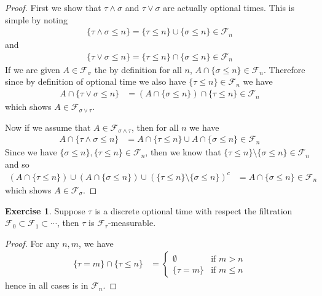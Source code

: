 \documentclass{amsart}
\theoremstyle{remark}
\theoremstyle{definition}
\newtheorem{ex}[thm]{Exercise}
\begin{document}
\begin{proof}
First we show that $\tau \wedge \sigma$ and $\tau \vee \sigma$ are
actually optional times.  This is simple by noting
\begin{align*}
\lbrace \tau \wedge \sigma \leq n \rbrace = \lbrace \tau \leq n
\rbrace \cup \lbrace \sigma \leq n \rbrace \in \mathcal{F}_n
\end{align*}
and
\begin{align*}
\lbrace \tau \vee \sigma \leq n \rbrace = \lbrace \tau \leq n
\rbrace \cap \lbrace \sigma \leq n \rbrace \in \mathcal{F}_n
\end{align*}
If we are given $A \in \mathcal{F}_\sigma$ the by definition for all
$n$, $A \cap \lbrace \sigma \leq n \rbrace \in \mathcal{F}_n$.
Therefore since by definition of optional time we also have $\lbrace
\tau \leq n \rbrace \in \mathcal{F}_n$ we have
\begin{align*}
A \cap \lbrace \tau \vee \sigma \leq n \rbrace &= (A \cap \lbrace \sigma \leq n
\rbrace) \cap \lbrace \tau \leq n \rbrace \in \mathcal{F}_n
\end{align*}
which shows $A \in \mathcal{F}_{\sigma \vee \tau}$.

Now if we assume that $A \in \mathcal{F}_{\sigma \wedge \tau}$, then
for all $n$ we have
\begin{align*}
A \cap \lbrace \tau \wedge \sigma \leq n \rbrace &= A \cap \lbrace \tau \leq n
\rbrace \cup A \cap \lbrace \sigma \leq n \rbrace \in \mathcal{F}_n
\end{align*}
Since we have $\lbrace \sigma \leq n \rbrace, \lbrace \tau \leq n
\rbrace \in \mathcal{F}_n$, then we know that $\lbrace \tau \leq n
\rbrace \setminus \lbrace \sigma \leq n\rbrace \in \mathcal{F}_n$ and
so 
\begin{align*}
\left( A \cap \lbrace \tau \leq n
\rbrace \right ) \cup \left (A \cap \lbrace \sigma \leq n \rbrace
\right ) \cup \left ( \lbrace \tau \leq n
\rbrace \setminus \lbrace \sigma \leq n\rbrace\right)^c &= A \cap \lbrace \sigma \leq n
\rbrace \in \mathcal{F}_n
\end{align*}
which shows $A \in \mathcal{F}_\sigma$.
\end{proof}

\begin{ex}Suppose $\tau$ is a discrete optional
  time with respect the filtration $\mathcal{F}_0 \subset
  \mathcal{F}_1 \subset \cdots$, then $\tau$ is $\mathcal{F}_\tau$-measurable.
\end{ex}
\begin{proof}
For any $n, m$, we have 
\begin{align*}
\lbrace \tau = m \rbrace  \cap \lbrace \tau \leq n \rbrace &=
\begin{cases}
\emptyset & \text{if $m > n$} \\
\lbrace \tau = m \rbrace & \text{if $m\leq n$}
\end{cases}
\end{align*}
hence in all cases is in $\mathcal{F}_n$.
\end{proof}
\end{document}
